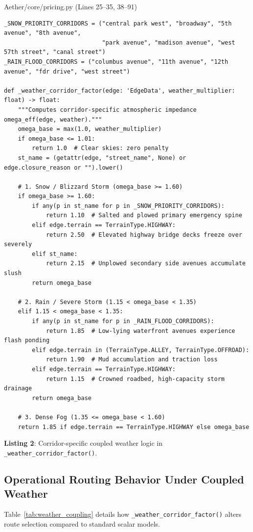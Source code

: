 \documentclass[10pt,a4paper]{article}
\begin{document}
\begin{codebox}{Aether/core/pricing.py (Lines 25--35, 38--91)}
\begin{lstlisting}[style=AetherPython]
_SNOW_PRIORITY_CORRIDORS = ("central park west", "broadway", "5th avenue", "8th avenue",
                            "park avenue", "madison avenue", "west 57th street", "canal street")
_RAIN_FLOOD_CORRIDORS = ("columbus avenue", "11th avenue", "12th avenue", "fdr drive", "west street")

def _weather_corridor_factor(edge: 'EdgeData', weather_multiplier: float) -> float:
    """Computes corridor-specific atmospheric impedance omega_eff(edge, weather)."""
    omega_base = max(1.0, weather_multiplier)
    if omega_base <= 1.01:
        return 1.0  # Clear skies: zero penalty
    st_name = (getattr(edge, "street_name", None) or edge.closure_reason or "").lower()

    # 1. Snow / Blizzard Storm (omega_base >= 1.60)
    if omega_base >= 1.60:
        if any(p in st_name for p in _SNOW_PRIORITY_CORRIDORS):
            return 1.10  # Salted and plowed primary emergency spine
        elif edge.terrain == TerrainType.HIGHWAY:
            return 2.50  # Elevated highway bridge decks freeze over severely
        elif st_name:
            return 2.15  # Unplowed secondary side avenues accumulate slush
        return omega_base

    # 2. Rain / Severe Storm (1.15 < omega_base < 1.35)
    elif 1.15 < omega_base < 1.35:
        if any(p in st_name for p in _RAIN_FLOOD_CORRIDORS):
            return 1.85  # Low-lying waterfront avenues experience flash ponding
        elif edge.terrain in (TerrainType.ALLEY, TerrainType.OFFROAD):
            return 1.90  # Mud accumulation and traction loss
        elif edge.terrain == TerrainType.HIGHWAY:
            return 1.15  # Crowned roadbed, high-capacity storm drainage
        return omega_base

    # 3. Dense Fog (1.35 <= omega_base < 1.60)
    return 1.85 if edge.terrain == TerrainType.HIGHWAY else omega_base
\end{lstlisting}
\end{codebox}
\vspace{-3pt}
\begin{center}\sffamily\footnotesize\textbf{Listing 2}: Corridor-specific coupled weather logic in \texttt{\_weather\_corridor\_factor()}.\end{center}

\subsection{Operational Routing Behavior Under Coupled Weather}
Table~\ref{tab:weather_coupling} details how \texttt{\_weather\_corridor\_factor()} alters route selection compared to standard scalar models.
\end{document}
